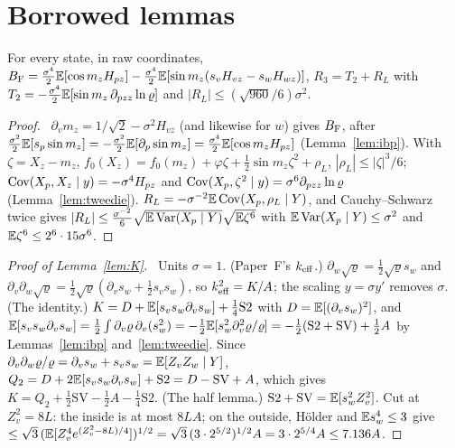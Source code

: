 \section{Borrowed lemmas}
\label{app:borrowed}

\begin{lemma}\label{lem:G2}
For every state, in raw coordinates, $B_{\mathrm F}=\frac{\sigma^4}2\mathbb{E}[\cos m_zH_{pz}]-\frac{\sigma^4}2\mathbb{E}[\sin m_z(s_vH_{vz}-s_wH_{wz})]$, $R_3=T_2+R_L$ with $T_2=-\frac{\sigma^4}2\mathbb{E}[\sin m_z\,\partial_{pzz}\ln\varrho]$ and $|R_L|\le(\sqrt{960}/6)\sigma^2$.
\end{lemma}
\begin{proof}\proofst\
$\partial_vm_z=1/\sqrt2-\sigma^2H_{vz}$ (and likewise for $w$) gives $B_{\mathrm F}$, after $\frac{\sigma^2}2\mathbb{E}[s_p\sin m_z]=-\frac{\sigma^2}2\mathbb{E}[\partial_p\sin m_z]=\frac{\sigma^4}2\mathbb{E}[\cos m_zH_{pz}]$ (Lemma~\ref{lem:ibp}).
With $\zeta=X_z-m_z$, $f_0(X_z)=f_0(m_z)+\varphi\zeta+\frac12\sin m_z\zeta^2+\rho_L$, $|\rho_L|\le|\zeta|^3/6$; $\operatorname{Cov}(X_p,X_z\mid y)=-\sigma^4H_{pz}$ and $\operatorname{Cov}(X_p,\zeta^2\mid y)=\sigma^6\partial_{pzz}\ln\varrho$ (Lemma~\ref{lem:tweedie}).
$R_L=-\sigma^{-2}\mathbb{E}\operatorname{Cov}(X_p,\rho_L\mid Y)$, and Cauchy--Schwarz twice gives $|R_L|\le\frac{\sigma^{-2}}6\sqrt{\mathbb{E}\operatorname{Var}(X_p\mid Y)}\sqrt{\mathbb{E}\zeta^6}$ with $\mathbb{E}\operatorname{Var}(X_p\mid Y)\le\sigma^2$ and $\mathbb{E}\zeta^6\le2^6\cdot15\sigma^6$.
\end{proof}

\begin{proof}[Proof of Lemma~\ref{lem:K}]\proofst\
Units $\sigma=1$.
(Paper~F's $k_{\mathrm{eff}}$.) $\partial_w\sqrt\varrho=\frac12\sqrt\varrho s_w$ and $\partial_v\partial_w\sqrt\varrho=\frac12\sqrt\varrho(\partial_vs_w+\frac12s_vs_w)$, so $k_{\mathrm{eff}}^2=K/A$; the scaling $y=\sigma y'$ removes $\sigma$.
(The identity.) $K=D+\mathbb{E}[s_vs_w\partial_vs_w]+\frac14\mathrm{S2}$ with $D=\mathbb{E}[(\partial_vs_w)^2]$, and $\mathbb{E}[s_vs_w\partial_vs_w]=\frac12\int\partial_v\varrho\,\partial_v(s_w^2)=-\frac12\mathbb{E}[s_w^2\partial_v^2\varrho/\varrho]=-\frac12(\mathrm{S2}+\mathrm{SV})+\frac12A$ by Lemmas~\ref{lem:ibp} and~\ref{lem:tweedie}.
Since $\partial_v\partial_w\varrho/\varrho=\partial_vs_w+s_vs_w=\mathbb{E}[Z_vZ_w\mid Y]$, $Q_2=D+2\mathbb{E}[s_vs_w\partial_vs_w]+\mathrm{S2}=D-\mathrm{SV}+A$, which gives $K=Q_2+\frac12\mathrm{SV}-\frac12A-\frac14\mathrm{S2}$.
(The half lemma.) $\mathrm{S2}+\mathrm{SV}=\mathbb{E}[s_w^2Z_v^2]$. Cut at $Z_v^2=8L$: the inside is at most $8LA$; on the outside, H\"older and $\mathbb{E} s_w^4\le3$ give $\le\sqrt3\,(\mathbb{E}[Z_v^4e^{(Z_v^2-8L)/4}])^{1/2}=\sqrt3\,(3\cdot2^{5/2})^{1/2}A=3\cdot2^{5/4}A\le7.136A$.
\end{proof}

